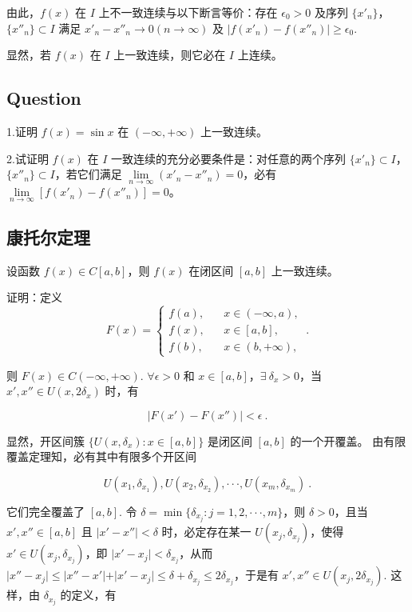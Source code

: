   由此，$f(x)$ 在 $I$ 上不一致连续与以下断言等价：存在 $\epsilon_0>0$ 及序列 $\{x'_n\}$，$\{x''_n\}\subset I$ 满足 $x'_n-x''_n\rightarrow0(n\rightarrow\infty)$ 及 $\vert f(x'_n)-f(x''_n)\vert\geq\epsilon_0$.

  显然，若 $f(x)$ 在 $I$ 上一致连续，则它必在 $I$ 上连续。

\subsection{Question}

1.证明 $f(x)=\sin x$ 在 $(-\infty,+\infty)$ 上一致连续。

2.试证明 $f(x)$ 在 $I$ 一致连续的充分必要条件是：对任意的两个序列 $\{x'_n\}\subset I$，$\{x''_n\}\subset I$，若它们满足 $\lim\limits_{n\rightarrow\infty}(x'_n-x''_n)=0$，必有 $\lim\limits_{n\rightarrow\infty}[f(x'_n)-f(x''_n)]=0$。

\subsection{康托尔定理}\label{sub_conff_1}

设函数 $f(x)\in C[a,b]$，则 $f(x)$ 在闭区间 $[a,b]$ 上一致连续。

证明：定义
$$
F(x)=\left\{
\begin{matrix}
f(a),\ \ \ \ &x\in(-\infty,a),\\
f(x),\ \ \ \ &x\in[a,b],\\
f(b),\ \ \ \ &x\in(b,+\infty),
\end{matrix}
\right.~.
$$

则 $F(x)\in C(-\infty,+\infty)$. $\forall \epsilon>0$ 和 $x\in[a,b]$，$\exists\ \delta_x>0$，当 $x',x''\in U(x,2\delta_x)$ 时，有

$$
\vert F(x')-F(x'')\vert<\epsilon~.
$$

显然，开区间簇 $\{U(x,\delta_x):x\in[a,b]\}$ 是闭区间 $[a,b]$ 的一个开覆盖。 由有限覆盖定理知，必有其中有限多个开区间

$$
U(x_1,\delta_{x_1}),U(x_2,\delta_{x_2}),\cdot\cdot\cdot,U(x_m,\delta_{x_m})~.
$$

它们完全覆盖了 $[a,b]$. 令 $\delta=\min\{\delta_{x_j}:j=1,2,\cdot\cdot\cdot,m\}$，则 $\delta>0$，且当 $x',x''\in[a,b]$ 且 $\vert x'-x''\vert<\delta$ 时，必定存在某一 $U(x_j,\delta_{x_j})$，使得 $x'\in U(x_j,\delta_{x_j})$，即 $\vert x'-x_j\vert<\delta_{x_j}$，从而 $\vert x''-x_j\vert\leq\vert x''-x'\vert+\vert x'-x_j\vert\leq\delta+\delta_{x_j}\leq2\delta_{x_j}$，于是有 $x',x''\in U(x_j,2\delta_{x_j})$. 这样，由 $\delta_{x_j}$ 的定义，有

